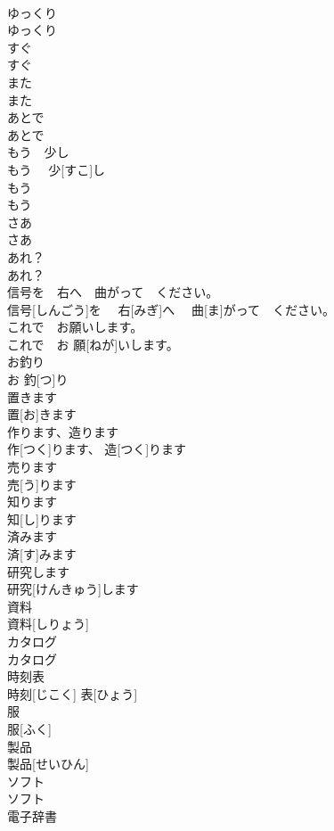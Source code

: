 \documentclass[8pt]{extreport}
\begin{document}
\begin{CJK}{UTF8}{min}
\\	ゆっくり	
\\	ゆっくり	
\\	すぐ	
\\	すぐ	
\\	また	
\\	また	
\\	あとで	
\\	あとで	
\\	もう　少し	
\\	もう　 少[すこ]し	
\\	もう　
\\	もう　
\\	さあ	
\\	さあ	
\\	あれ？	
\\	あれ？	
\\	信号を　右へ　曲がって　ください。	
\\	信号[しんごう]を　 右[みぎ]へ　 曲[ま]がって　ください。	
\\	これで　お願いします。	
\\	これで　お 願[ねが]いします。	
\\	お釣り	
\\	お 釣[つ]り	
\\	置きます	
\\	置[お]きます	
\\	作ります、造ります	
\\	作[つく]ります、 造[つく]ります	
\\	売ります	
\\	売[う]ります	
\\	知ります	
\\	知[し]ります	
\\	済みます	
\\	済[す]みます	
\\	研究します	
\\	研究[けんきゅう]します	
\\	資料	
\\	資料[しりょう]	
\\	カタログ	
\\	カタログ	
\\	時刻表	
\\	時刻[じこく] 表[ひょう]	
\\	服	
\\	服[ふく]	
\\	製品	
\\	製品[せいひん]	
\\	ソフト	
\\	ソフト	
\\	電子辞書	

\end{CJK}
\end{document}
